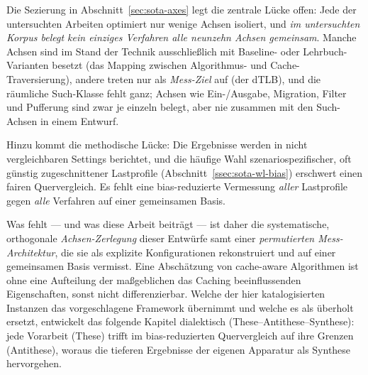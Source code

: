 Die Sezierung in Abschnitt~\ref{sec:sota-axes} legt die zentrale Lücke offen: Jede der untersuchten
Arbeiten optimiert nur wenige Achsen isoliert, und
\emph{im untersuchten Korpus belegt kein einziges Verfahren alle neunzehn Achsen gemeinsam}. Manche
Achsen sind im Stand der Technik ausschließlich mit Baseline- oder Lehrbuch-Varianten besetzt (das
Mapping zwischen Algorithmus- und Cache-Traversierung), andere treten nur als \emph{Mess-Ziel} auf
(der dTLB), und die räumliche Such-Klasse fehlt ganz; Achsen wie Ein-/Ausgabe, Migration, Filter und
Pufferung sind zwar je einzeln belegt, aber nie zusammen mit den Such-Achsen in einem Entwurf.

Hinzu kommt die methodische Lücke: Die Ergebnisse werden in nicht vergleichbaren Settings berichtet,
und die häufige Wahl szenariospezifischer, oft günstig zugeschnittener Lastprofile
(Abschnitt~\ref{ssec:sota-wl-bias}) erschwert einen fairen Quervergleich. Es fehlt eine
bias-reduzierte Vermessung \emph{aller} Lastprofile gegen \emph{alle} Verfahren auf einer
gemeinsamen Basis.

Was fehlt --- und was diese Arbeit beiträgt --- ist daher die systematische, orthogonale
\emph{Achsen-Zerlegung} dieser Entwürfe samt einer \emph{permutierten Mess-Architektur}, die sie als
explizite Konfigurationen rekonstruiert und auf einer gemeinsamen Basis vermisst. Eine Abschätzung
von cache-aware Algorithmen ist ohne eine Aufteilung der maßgeblichen das Caching beeinflussenden
Eigenschaften, sonst nicht differenzierbar. Welche der hier katalogisierten Instanzen das
vorgeschlagene Framework übernimmt und welche es als überholt ersetzt, entwickelt das folgende
Kapitel dialektisch (These--Antithese--Synthese): jede Vorarbeit (These) trifft im bias-reduzierten
Quervergleich auf ihre Grenzen (Antithese), woraus die tieferen Ergebnisse der eigenen Apparatur als
Synthese hervorgehen.
